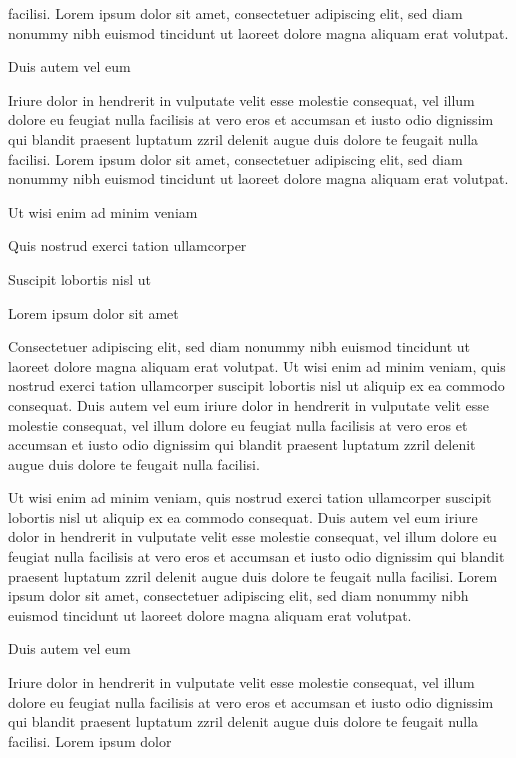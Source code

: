 \documentclass[11pt,twoside]{article}\makeatletter
\begin{document}
      facilisi. Lorem ipsum dolor sit amet, consectetuer adipiscing elit,
      sed diam nonummy nibh euismod tincidunt ut laoreet dolore magna
      aliquam erat volutpat. \par Duis autem vel eum \par Iriure dolor in hendrerit in vulputate velit esse molestie
      consequat, vel illum dolore eu feugiat nulla facilisis at vero eros et
      accumsan et iusto odio dignissim qui blandit praesent luptatum zzril
      delenit augue duis dolore te feugait nulla facilisi. Lorem ipsum dolor
      sit amet, consectetuer adipiscing elit, sed diam nonummy nibh euismod
      tincidunt ut laoreet dolore magna aliquam erat volutpat. \par Ut wisi enim ad minim veniam\par Quis nostrud exerci tation ullamcorper \par Suscipit lobortis nisl ut \par Lorem ipsum dolor sit amet\par Consectetuer adipiscing elit, sed diam nonummy nibh euismod
      tincidunt ut laoreet dolore magna aliquam erat volutpat. Ut wisi enim
      ad minim veniam, quis nostrud exerci tation ullamcorper suscipit
      lobortis nisl ut aliquip ex ea commodo consequat. Duis autem vel eum
      iriure dolor in hendrerit in vulputate velit esse molestie consequat,
      vel illum dolore eu feugiat nulla facilisis at vero eros et accumsan
      et iusto odio dignissim qui blandit praesent luptatum zzril delenit
      augue duis dolore te feugait nulla facilisi.\par Ut wisi enim ad minim veniam, quis nostrud exerci tation
      ullamcorper suscipit lobortis nisl ut aliquip ex ea commodo
      consequat. Duis autem vel eum iriure dolor in hendrerit in vulputate
      velit esse molestie consequat, vel illum dolore eu feugiat nulla
      facilisis at vero eros et accumsan et iusto odio dignissim qui blandit
      praesent luptatum zzril delenit augue duis dolore te feugait nulla
      facilisi. Lorem ipsum dolor sit amet, consectetuer adipiscing elit,
      sed diam nonummy nibh euismod tincidunt ut laoreet dolore magna
      aliquam erat volutpat. \par Duis autem vel eum \par Iriure dolor in hendrerit in vulputate velit esse molestie
      consequat, vel illum dolore eu feugiat nulla facilisis at vero eros et
      accumsan et iusto odio dignissim qui blandit praesent luptatum zzril
      delenit augue duis dolore te feugait nulla facilisi. Lorem ipsum dolor
\end{document}
